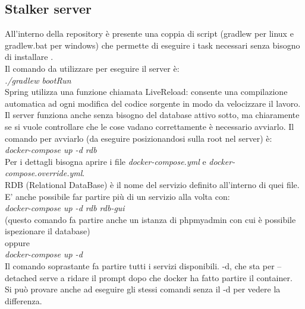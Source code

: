 \documentclass[../manuale-sviluppatore.tex]{subfiles}
\begin{document}
\subsection{Stalker server}

All'interno della repository è presente una coppia di script (gradlew per linux e gradlew.bat per windows) che permette di eseguire i task necessari 
senza bisogno di installare .\\
Il comando da utilizzare per eseguire il server è:\\

\emph{./gradlew bootRun}\\

Spring utilizza una funzione chiamata LiveReload: consente una compilazione automatica ad ogni modifica del codice sorgente in modo da velocizzare il lavoro.\\
Il server funziona anche senza bisogno del database attivo sotto, ma chiaramente se si vuole controllare che le cose vadano correttamente è necessario avviarlo.
Il comando per avviarlo (da eseguire posizionandosi sulla root nel server) è:\\

\emph{docker-compose up -d rdb}\\

Per i dettagli bisogna aprire i file \emph{docker-compose.yml} e \emph{docker-compose.override.yml}.\\
RDB (Relational DataBase) è il nome del servizio definito all'interno di quei file. \\
E' anche possibile far partire più di un servizio alla volta con:\\

\emph{docker-compose up -d rdb rdb-gui}\\

(questo comando fa partire anche un istanza di phpmyadmin con cui è possibile ispezionare il database)\\

oppure\\

\emph{docker-compose up -d}\\

Il comando soprastante fa partire tutti i servizi disponibili. -d, che sta per --detached serve a ridare il prompt dopo che docker ha fatto partire il container.\\ 
Si può provare anche ad eseguire gli stessi comandi senza il -d per vedere la differenza.\\
\end{document}
